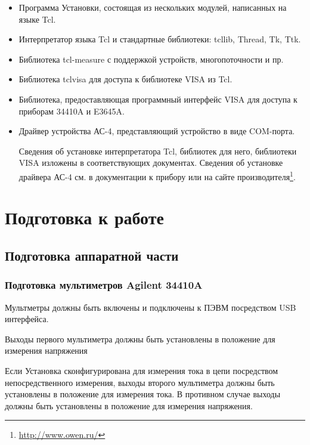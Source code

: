 \documentclass[12pt, a4paper, twocolumn]{book}
\begin{document}
\begin{itemize}

\item Программа Установки, состоящая из нескольких модулей, написанных на языке Tcl.

\item Интерпретатор языка Tcl и стандартные библиотеки: tcllib, Thread, Tk, Ttk.

\item Библиотека tcl-measure с поддержкой устройств, многопоточности и пр.

\item Библиотека tclvisa для доступа к библиотеке VISA из Tcl.

\item Библиотека, предоставляющая программный интерфейс VISA для доступа к приборам 34410A и E3645A.

\item Драйвер устройства АС-4, представляющий устройство в виде COM-порта.

Сведения об установке интерпретатора Tcl, библиотек для него, библиотеки VISA изложены в соответствующих документах. Сведения об установке драйвера АС-4 см. в документации к прибору или на сайте производителя\footnote{\href{http://www.owen.ru/}{http://www.owen.ru/}}.

\end{itemize}

\chapter{Подготовка к работе}

\section{Подготовка аппаратной части}

\subsection{Подготовка мультиметров Agilent 34410A}

Мультметры должны быть включены и подключены к ПЭВМ посредством USB интерфейса.

Выходы первого мультиметра должны быть установлены в положение для измерения напряжения

Если Установка сконфигурирована для измерения тока в цепи посредством непосредственного измерения, выходы второго мультиметра должны быть установлены в положение для измерения тока. В противном случае выходы должны быть установлены в положение для измерения напряжения.
\end{document}
